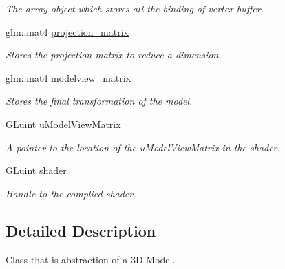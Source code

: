 \begin{DoxyCompactItemize}
\begin{DoxyCompactList}\small\item\em The array object which stores all the binding of vertex buffer. \end{DoxyCompactList}\item 
glm\+::mat4 \hyperlink{classcft_1_1Model_a89377ec3e5c9d2840323b09ad7d32fc6}{projection\+\_\+matrix}\hypertarget{classcft_1_1Model_a89377ec3e5c9d2840323b09ad7d32fc6}{}\label{classcft_1_1Model_a89377ec3e5c9d2840323b09ad7d32fc6}

\begin{DoxyCompactList}\small\item\em Stores the projection matrix to reduce a dimension. \end{DoxyCompactList}\item 
glm\+::mat4 \hyperlink{classcft_1_1Model_a67e3c1d4c9db01015040d279c82ea08a}{modelview\+\_\+matrix}\hypertarget{classcft_1_1Model_a67e3c1d4c9db01015040d279c82ea08a}{}\label{classcft_1_1Model_a67e3c1d4c9db01015040d279c82ea08a}

\begin{DoxyCompactList}\small\item\em Stores the final transformation of the model. \end{DoxyCompactList}\item 
G\+Luint \hyperlink{classcft_1_1Model_afee6e788975d7109251c4a53e466fc56}{u\+Model\+View\+Matrix}\hypertarget{classcft_1_1Model_afee6e788975d7109251c4a53e466fc56}{}\label{classcft_1_1Model_afee6e788975d7109251c4a53e466fc56}

\begin{DoxyCompactList}\small\item\em A pointer to the location of the u\+Model\+View\+Matrix in the shader. \end{DoxyCompactList}\item 
G\+Luint \hyperlink{classcft_1_1Model_abf5e28a2f2ae754aa00f5fc92c983dc5}{shader}\hypertarget{classcft_1_1Model_abf5e28a2f2ae754aa00f5fc92c983dc5}{}\label{classcft_1_1Model_abf5e28a2f2ae754aa00f5fc92c983dc5}

\begin{DoxyCompactList}\small\item\em Handle to the complied shader. \end{DoxyCompactList}\end{DoxyCompactItemize}


\subsection{Detailed Description}
Class that is abstraction of a 3\+D-\/\+Model. 


